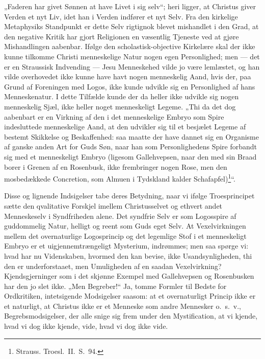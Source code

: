 \documentclass[12pt]{book}
\begin{document}
„Faderen har givet Sønnen at have Livet i sig selv“; heri ligger, at
Christus giver Verden et nyt Liv, idet han i Verden indfører et nyt
Selv. Fra den kirkelige Metaphysiks Standpunkt er dette Selv
rigtignok blevet mishandlet i den Grad, at den negative Kritik har
gjort Religionen en væsentlig Tjeneste ved at gjøre Mishandlingen
aabenbar. Ifølge den scholastisk-objective Kirkelære skal der ikke
kunne tilkomme Christi menneskelige Natur nogen egen Personlighed;
men --- det er en Straussisk Indvending --- Jesu Menneskehed vilde
jo være lemlæstet, og han vilde overhovedet ikke kunne have havt
nogen menneskelig Aand, hvis der, paa Grund af Foreningen med Logos,
ikke kunde udvikle sig en Personlighed af hans Menneskenatur. I
dette Tilfælde kunde der da heller ikke udvikle sig nogen menneskelig
Sjæl, ikke heller noget menneskeligt Legeme. „Thi da det dog
aabenbart er en Virkning af den i det menneskelige Embryo som Spire
indesluttede menneskelige Aand, at den udvikler sig til et besjælet
Legeme af bestemt Skikkelse og Beskaffenhed: saa maatte der have
dannet sig en Organisme af ganske anden Art for Guds Søn, naar han
som Personlighedens Spire forbandt sig med et menneskeligt Embryo
(ligesom Gallehvepsen, naar den med sin Braad borer i Grenen af en
Rosenbusk, ikke frembringer nogen Rose, men den mosbedækkede
Concretion, som Almuen i Tydskland kalder
Schafapfel)\footnote{Strauss. Troesl.\ II.\ S.\ 94.}“.

Disse og lignende Indsigelser tabe deres Betydning, naar vi ifølge
Troesprincipet sætte den qvalitative Forskjel imellem Christusselvet
og ethvert andet Menneskeselv i Syndfriheden alene. Det syndfrie
Selv er som Logosspire af guddommelig Natur, helligt og reent som
Guds eget Selv. At Vexelvirkningen mellem det overnaturlige
Logosprincip og det legemlige Stof i et menneskeligt Embryo er et
uigjennemtrængeligt Mysterium, indrømmes; men saa spørge vi: hvad
har nu Videnskaben, hvormed den kan bevise, ikke Usandsynligheden,
thi den er underforstaaet, men Umuligheden af en saadan
Vexelvirkning? Kjendsgjerninger som i det skjønne Exempel med
Gallehvepsen og Rosenbusken har den jo slet ikke. „Men Begreber!“
Ja, tomme Formler til Bedste for Ordkritiken, intetsigende
Modsigelser saasom: at et overnaturligt Princip ikke er et
naturligt, at Christus ikke er et Menneske som andre Mennesker
o.\ s.\ v., Begrebsmodsigelser, der alle snige sig frem under den
Mystification, at vi kjende, hvad vi dog ikke kjende, vide, hvad vi
dog ikke vide.
\end{document}
